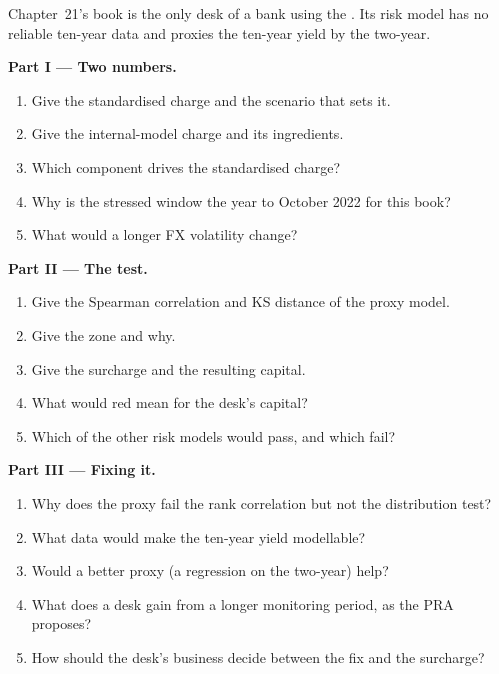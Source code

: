 \begin{problem}\label{pb:rc:regulatory-capital-for-trading-books:1}
Chapter~21's book is the only desk of a bank using the . Its risk model
has no reliable ten-year data and proxies the ten-year yield by the two-year.

\medskip\noindent\textbf{Part I --- Two numbers.}
\begin{enumerate}
\item Give the standardised charge and the scenario that sets it.
\item Give the internal-model charge and its ingredients.
\item Which component drives the standardised charge?
\item Why is the stressed window the year to October 2022 for this book?
\item What would a longer FX volatility  change?
\end{enumerate}

\medskip\noindent\textbf{Part II --- The test.}
\begin{enumerate}[resume]
\item Give the Spearman correlation and KS distance of the proxy model.
\item Give the zone and why.
\item Give the surcharge and the resulting capital.
\item What would red mean for the desk's capital?
\item Which of the other risk models would pass, and which fail?
\end{enumerate}

\medskip\noindent\textbf{Part III --- Fixing it.}
\begin{enumerate}[resume]
\item Why does the proxy fail the rank correlation but not the distribution test?
\item What data would make the ten-year yield modellable?
\item Would a better proxy (a regression on the two-year) help?
\item What does a desk gain from a longer monitoring period, as the PRA proposes?
\item How should the desk's business decide between the fix and the surcharge?
\end{enumerate}


\end{problem}
